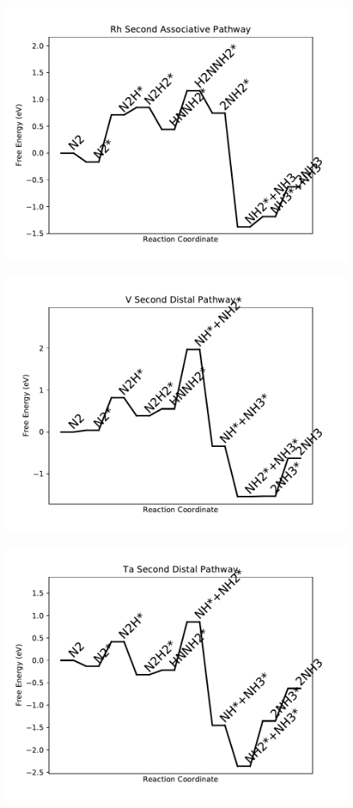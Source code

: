 \begin{figure}
\includegraphics[width=0.8\linewidth]{data/plots/Rh_associative_2.pdf}
\label{fig:Rh_associative_2}
\end{figure}

\begin{figure}
\includegraphics[width=0.8\linewidth]{data/plots/V_distal_2.pdf}
\label{fig:V_distal_2}
\end{figure}

\begin{figure}
\includegraphics[width=0.8\linewidth]{data/plots/Ta_distal_2.pdf}
\label{fig:Ta_distal_2}
\end{figure}

